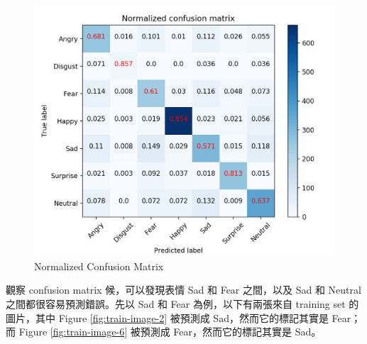 \documentclass[12pt,a4paper]{extarticle}
\begin{document}
\begin{enumerate}
  \begin{figure}[ht]
    \centering
    \includegraphics[width=\linewidth]{images/conf_mat_normalized.png}
    \caption{Normalized Confusion Matrix}
    \label{fig:confusioin-matrix}
  \end{figure}

  \par 觀察 confusion matrix 候，可以發現表情 Sad 和 Fear 之間，以及 Sad 和 Neutral 之間都很容易預測錯誤。先以 Sad 和 Fear 為例，以下有兩張來自 training set 的圖片，其中 Figure \ref{fig:train-image-2} 被預測成 Sad，然而它的標記其實是 Fear；而 Figure \ref{fig:train-image-6} 被預測成 Fear，然而它的標記其實是 Sad。


\end{enumerate}
\end{document}
